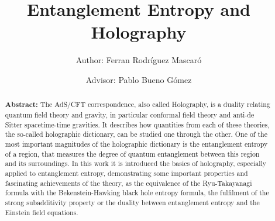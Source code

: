 \documentclass[twocolumn]{revtex4}
\begin{document}
\pagestyle{fancy}


\title{Entanglement Entropy and Holography}
\author{Author: Ferran Rodríguez Mascaró}
\author{Advisor: Pablo Bueno Gómez}


\begin{abstract}
    {\bf Abstract:} The AdS/CFT correspondence, also called Holography, is a duality relating quantum field theory and gravity, in particular conformal field theory and anti-de Sitter spacetime-time gravities. It describes how quantities from each of these theories, the so-called holographic dictionary, can be studied one through the other. One of the most important magnitudes of the holographic dictionary is the entanglement entropy of a region, that measures the degree of quantum entanglement between this region and its surroundings. In this work it is introduced the basics of holography, especially applied to entanglement entropy, demonstrating some important properties and fascinating achievements of the theory, as the equivalence of the Ryu-Takayanagi formula with the Bekenstein-Hawking black hole entropy formula, the fulfilment of the strong subadditivity property or the duality between entanglement entropy and the Einstein field equations.
\end{abstract}


\maketitle




\end{document}
